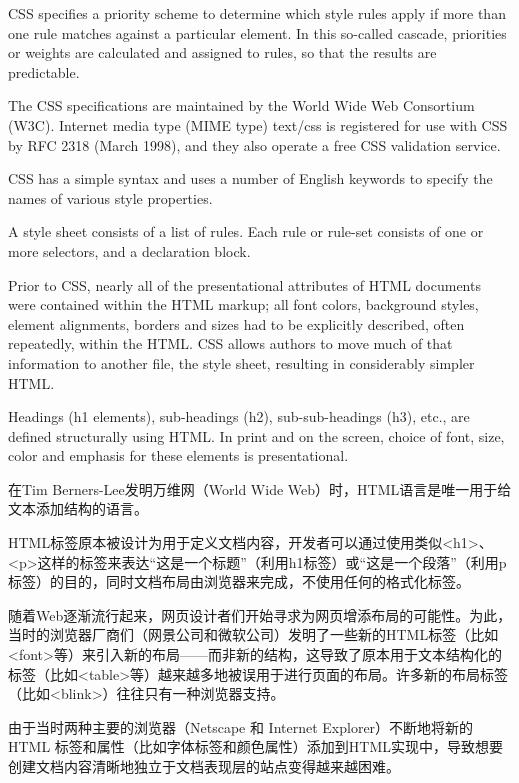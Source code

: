 CSS specifies a priority scheme to determine which style rules apply if more than one rule matches against a particular element. In this so-called cascade, priorities or weights are calculated and assigned to rules, so that the results are predictable.

The CSS specifications are maintained by the World Wide Web Consortium (W3C). Internet media type (MIME type) text/css is registered for use with CSS by RFC 2318 (March 1998), and they also operate a free CSS validation service.

CSS has a simple syntax and uses a number of English keywords to specify the names of various style properties.

A style sheet consists of a list of rules. Each rule or rule-set consists of one or more selectors, and a declaration block.

Prior to CSS, nearly all of the presentational attributes of HTML documents were contained within the HTML markup; all font colors, background styles, element alignments, borders and sizes had to be explicitly described, often repeatedly, within the HTML. CSS allows authors to move much of that information to another file, the style sheet, resulting in considerably simpler HTML.


Headings (h1 elements), sub-headings (h2), sub-sub-headings (h3), etc., are defined structurally using HTML. In print and on the screen, choice of font, size, color and emphasis for these elements is presentational.



在Tim Berners-Lee发明万维网（World Wide Web）时，HTML语言是唯一用于给文本添加结构的语言。

HTML标签原本被设计为用于定义文档内容，开发者可以通过使用类似<h1>、<p>这样的标签来表达“这是一个标题”（利用h1标签）或“这是一个段落”（利用p标签）的目的，同时文档布局由浏览器来完成，不使用任何的格式化标签。


随着Web逐渐流行起来，网页设计者们开始寻求为网页增添布局的可能性。为此，当时的浏览器厂商们（网景公司和微软公司）发明了一些新的HTML标签（比如<font>等）来引入新的布局——而非新的结构，这导致了原本用于文本结构化的标签（比如<table>等）越来越多地被误用于进行页面的布局。许多新的布局标签（比如<blink>）往往只有一种浏览器支持。

由于当时两种主要的浏览器（Netscape 和 Internet Explorer）不断地将新的 HTML 标签和属性（比如字体标签和颜色属性）添加到HTML实现中，导致想要创建文档内容清晰地独立于文档表现层的站点变得越来越困难。



